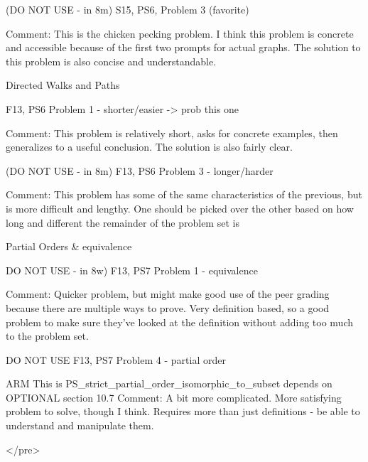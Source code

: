 \documentclass[handout]{mcs}
\begin{document}
\begin{staffnotes}
  (DO NOT USE - in 8m)   S15, PS6, Problem 3 (favorite) 

Comment: This is the chicken pecking problem. I think this problem is
concrete and accessible because of the first two prompts for actual
graphs.  The solution to this problem is also concise and
understandable.

    Directed Walks and Paths

       F13, PS6 Problem 1 - shorter/easier -> prob this one

Comment: This problem is relatively short, asks for concrete examples,
then generalizes to a useful conclusion. The solution is also fairly
clear.

(DO NOT USE - in 8m)    F13, PS6 Problem 3 - longer/harder 

Comment: This problem has some of the same characteristics of the
previous, but is more difficult and lengthy. One should be picked over
the other based on how long and different the remainder of the problem
set is

    Partial Orders & equivalence

DO NOT USE - in 8w)      F13, PS7 Problem 1 - equivalence

Comment: Quicker problem, but might make good use of the peer grading
because there are multiple ways to prove. Very definition based, so a
good problem to make sure they’ve looked at the definition without
adding too much to the problem set.

DO NOT USE              F13, PS7 Problem 4 - partial order

ARM This is PS_strict_partial_order_isomorphic_to_subset depends on OPTIONAL
    section 10.7
Comment: A bit more complicated. More satisfying problem to solve,
though I think. Requires more than just definitions - be able to
understand and manipulate them.

</pre>
\end{staffnotes}




\end{document}
